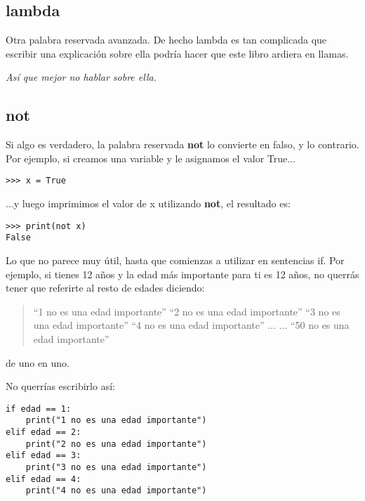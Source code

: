 \subsection*{lambda}

Otra palabra reservada avanzada. De hecho lambda es tan complicada que escribir una explicación sobre ella podría hacer que este libro ardiera en llamas.
\par
\emph{Así que mejor no hablar sobre ella.}

\subsection*{not}

Si algo es verdadero, la palabra reservada \textbf{not} lo convierte en falso, y lo contrario.  Por ejemplo, si creamos una variable  y le asignamos el valor True...

\begin{listing}
\begin{verbatim}
>>> x = True
\end{verbatim}
\end{listing}

...y luego imprimimos el valor de x utilizando \textbf{not}, el resultado es:

\begin{listing}
\begin{verbatim}
>>> print(not x)
False
\end{verbatim}
\end{listing}

Lo que no parece muy útil, hasta que comienzas a utilizar  en sentencias if.  Por ejemplo, si tienes 12 años y la edad más importante para ti es 12 años, no querrás tener que referirte al resto de edades diciendo:

\begin{quotation}
``1 no es una edad importante''
``2 no es una edad importante''
``3 no es una edad importante''
``4 no es una edad importante''
...
...
``50 no es una edad importante''
\end{quotation}

de uno en uno.
\par\noindent
No querrías escribirlo así:

\begin{listing}
\begin{verbatim}
if edad == 1:
    print("1 no es una edad importante")
elif edad == 2:
    print("2 no es una edad importante")
elif edad == 3:
    print("3 no es una edad importante")
elif edad == 4:
    print("4 no es una edad importante")
\end{verbatim}
\end{listing}

